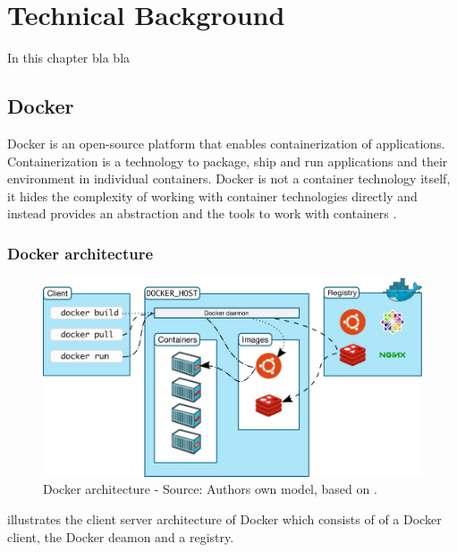 \chapter{Technical Background}
\label{sec:background}
%
In this chapter bla bla


\section{Docker}
Docker is an open-source platform that enables containerization of applications. Containerization is a technology to package, ship and run applications and their environment in individual containers.
Docker is not a container technology itself, it hides the complexity of working with container technologies directly and instead provides an abstraction and the tools to work with containers \cite{Nickoloff2019Docker, Bullington2020Docker, Potdar2020Docker}.


\subsection{Docker architecture}

\begin{figure}[h]%
\centering
\includegraphics[scale=0.5]{images/04_technical_background/docker_architecture}%
\caption{Docker architecture - Source: Authors own model, based on \cite{Docker2020Docs}.}%
\label{fig:spark_docker_architecture}%
\end{figure}

 illustrates the client server architecture of Docker which consists of of a Docker client, the Docker deamon and a registry.


